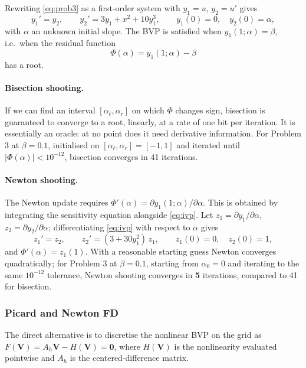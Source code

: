 \documentclass[11pt]{article}
\theoremstyle{plain}
\theoremstyle{remark}
\newcommand{\Ah}{A_h}
\begin{document}
Rewriting \cref{eq:prob3} as a first-order system with $y_1 = u$, $y_2 = u'$
gives
\begin{equation}
y_1' = y_2, \qquad y_2' = 3 y_1 + x^2 + 10 y_1^3, \qquad y_1(0) = 0, \quad y_2(0) = \alpha,
\label{eq:ivp}
\end{equation}
with $\alpha$ an unknown initial slope. The BVP is satisfied when
$y_1(1; \alpha) = \beta$, i.e.\ when the residual function
\begin{equation}
\Phi(\alpha) = y_1(1; \alpha) - \beta
\end{equation}
has a root.

\paragraph{Bisection shooting.} If we can find an interval
$[\alpha_\ell, \alpha_r]$ on which $\Phi$ changes sign, bisection is
guaranteed to converge to a root, linearly, at a rate of one bit per
iteration. It is essentially an oracle: at no point does it need
derivative information. For Problem 3 at $\beta = 0.1$, initialised on
$[\alpha_\ell, \alpha_r] = [-1, 1]$ and iterated until
$|\Phi(\alpha)| < 10^{-12}$, bisection converges in 41 iterations.

\paragraph{Newton shooting.} The Newton update requires
$\Phi'(\alpha) = \partial y_1(1;\alpha)/\partial \alpha$. This is obtained
by integrating the sensitivity equation alongside \cref{eq:ivp}. Let
$z_1 = \partial y_1/\partial \alpha$, $z_2 = \partial y_2/\partial \alpha$;
differentiating \cref{eq:ivp} with respect to $\alpha$ gives
\begin{equation}
z_1' = z_2, \qquad z_2' = (3 + 30 y_1^2)\,z_1, \qquad z_1(0) = 0, \quad z_2(0) = 1,
\label{eq:sens}
\end{equation}
and $\Phi'(\alpha) = z_1(1)$. With a reasonable starting guess Newton
converges quadratically; for Problem 3 at $\beta = 0.1$, starting from
$\alpha_0 = 0$ and iterating to the same $10^{-12}$ tolerance, Newton
shooting converges in \textbf{5} iterations, compared to 41 for bisection.


\subsubsection{Picard and Newton FD}
\label{sec:picardnewton}

The direct alternative is to discretise the nonlinear BVP on the grid as
$F(\mathbf{V}) = \Ah \mathbf{V} - H(\mathbf{V}) = \mathbf{0}$, where
$H(\mathbf{V})$ is the nonlinearity evaluated pointwise and
$\Ah$ is the centered-difference matrix.
\end{document}
